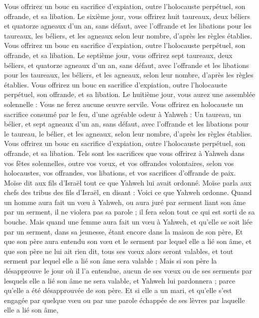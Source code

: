 \begin{multicols}{2}
Vous offrirez un bouc en sacrifice d’expiation, outre l'holocauste perpétuel, son offrande, et sa libation.
Le sixième jour, vous offrirez huit taureaux, deux béliers et quatorze agneaux d'un an, sans défaut,
avec l’offrande et les libations pour les taureaux, les béliers, et les agneaux selon leur nombre, d’après les règles établies.
Vous offrirez un bouc en sacrifice d’expiation, outre l'holocauste perpétuel, son offrande, et sa libation.
Le septième jour, vous offrirez sept taureaux, deux béliers, et quatorze agneaux d'un an, sans défaut,
avec l’offrande et les libations pour les taureaux, les béliers, et les agneaux, selon leur nombre, d’après les règles établies.
Vous offrirez un bouc en sacrifice d’expiation, outre l'holocauste perpétuel, son offrande, et sa libation.
Le huitième jour, vous aurez une assemblée solennelle : Vous ne ferez aucune œuvre servile.
Vous offrirez en holocauste un sacrifice consumé par le feu, d’une agréable odeur à Yahweh : Un taureau, un bélier, et sept agneaux d'un an, sans défaut,
avec l’offrande et les libations pour le taureau, le bélier, et les agneaux, selon leur nombre, d’après les règles établies.
Vous offrirez un bouc en sacrifice d’expiation, outre l'holocauste perpétuel, son offrande, et sa libation.
Tels sont les sacrifices que vous offrirez à Yahweh dans vos fêtes solennelles, outre vos vœux, et vos offrandes volontaires, selon vos holocaustes, vos offrandes, vos libations, et vos sacrifices d’offrande de paix.
\VerseOne{}Moïse dit aux fils d’Israël tout ce que Yahweh lui avait ordonné.
Moïse parla aux chefs des tribus des fils d'Israël, en disant : Voici ce que Yahweh ordonne.
Quand un homme aura fait un vœu à Yahweh, ou aura juré par serment liant son âme par un serment, il ne violera pas sa parole ; il fera selon tout ce qui est sorti de sa bouche.
Mais quand une femme aura fait un vœu à Yahweh, et qu’elle se soit liée par un serment, dans sa jeunesse, étant encore dans la maison de son père,
Et que son père aura entendu son vœu et le serment par lequel elle a lié son âme, et que son père ne lui ait rien dit, tous ses vœux alors seront valables, et tout serment par lequel elle a lié son âme sera valable ;
Mais si son père la désapprouve le jour où il l’a entendue, aucun de ses vœux ou de ses serments par lesquels elle a lié son âme ne sera valable, et Yahweh lui pardonnera ; parce qu’elle a été désapprouvée de son père.
Et si elle a un mari, et qu’elle s’est engagée par quelque vœu ou par une parole échappée de ses lèvres par laquelle elle a lié son âme,

\end{multicols}
